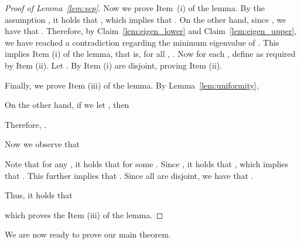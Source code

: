 \documentclass[11pt]{article}
\theoremstyle{plain}
\begin{document}
\begin{proof}[Proof of Lemma~\ref{lem:sep}]
Now we prove Item~(i) of the lemma. By the
assumption , it holds
that , which implies
that
.
On the other hand, since , we have that
. Therefore,
by Claim~\ref{lem:eigen_lower} and Claim~\ref{lem:eigen_upper}, we have reached
a contradiction regarding the minimum eigenvalue of .
This implies Item (i) of the lemma, that is, for all ,
. Now for each , define  as required by Item (ii). Let . By Item (i)  are disjoint, proving
Item (ii).

Finally, we prove Item (iii) of the lemma. By
Lemma~\ref{lem:uniformity},

On the other hand, if we let , then

Therefore,
. 

Now we observe that 


Note that for any , it holds that  for some . Since , it holds that , which implies that . This further implies that . Since all  are disjoint, we have that .

Thus, it holds that 

which proves the Item (iii) of the lemma.
\end{proof}

We are now ready to prove our main theorem.
\end{document}
